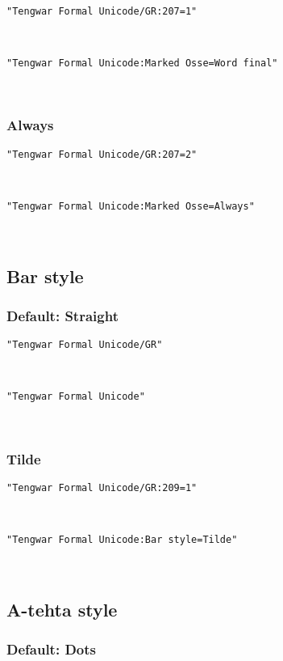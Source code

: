 \documentclass[11pt,a4paper]{article}
\begin{document}
\texttt{"Tengwar Formal Unicode/GR:207=1"}

\formalGRossefinal 

\noindent \texttt{"Tengwar Formal Unicode:Marked Osse=Word final"}

\formalAATossefinal 

\subsubsection{Always}

\texttt{"Tengwar Formal Unicode/GR:207=2"}

\formalGRossealways 

\noindent \texttt{"Tengwar Formal Unicode:Marked Osse=Always"}

\formalAATossealways 


\subsection{Bar style}

\subsubsection{Default: Straight}

\texttt{"Tengwar Formal Unicode/GR"}

\formalGR 

\noindent \texttt{"Tengwar Formal Unicode"}

\formalAAT 

\subsubsection{Tilde}

\texttt{"Tengwar Formal Unicode/GR:209=1"}

\formalGRtilde 

\noindent \texttt{"Tengwar Formal Unicode:Bar style=Tilde"}

\formalAATtilde 


\subsection{A-tehta style}

\subsubsection{Default: Dots}
\end{document}
